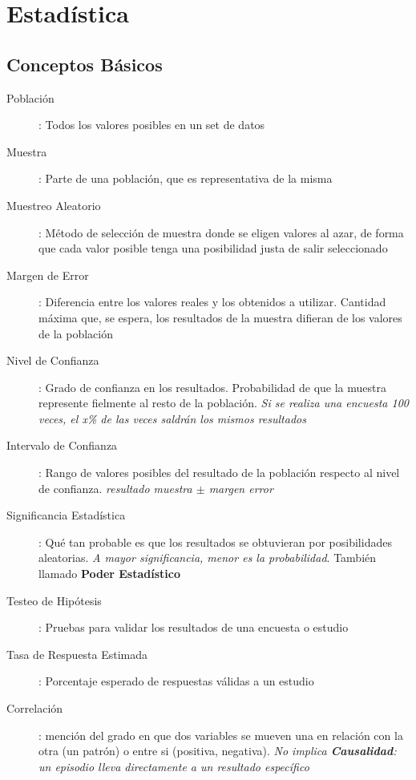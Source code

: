 
\section{Estadística}
\subsection{Conceptos Básicos}
\begin{description}
    \item [Población]{: Todos los valores posibles en un set de datos}
    \item [Muestra]{: Parte de una población, que es representativa de la misma}
    \item [Muestreo Aleatorio]{: Método de selección de muestra donde se eligen valores al azar, de forma que cada valor posible tenga una posibilidad justa de salir seleccionado}
    \item [Margen de Error]{: Diferencia entre los valores reales y los obtenidos a utilizar. Cantidad máxima que, se espera, los resultados de la muestra difieran de los valores de la población}
    \item [Nivel de Confianza]{: Grado de confianza en los resultados. Probabilidad de que la muestra represente fielmente al resto de la población. \textit{Si se realiza una encuesta 100 veces, el x\% de las veces saldrán los mismos resultados}}
    \item [Intervalo de Confianza]{: Rango de valores posibles del resultado de la población respecto al nivel de confianza. \textit{resultado muestra ${\pm}$ margen error}}
    \item [Significancia Estadística]{: Qué tan probable es que los resultados se obtuvieran por posibilidades aleatorias. \textit{A mayor significancia, menor es la probabilidad}. También llamado \textbf{Poder Estadístico}} 
    \item [Testeo de Hipótesis]{: Pruebas para validar los resultados de una encuesta o estudio}
    \item [Tasa de Respuesta Estimada]{: Porcentaje esperado de respuestas válidas a un estudio}
    \item [Correlación]{: mención del grado en que dos variables se mueven una en relación con la otra (un patrón) o entre si (positiva, negativa). \textit{No implica \textbf{Causalidad}: un episodio lleva directamente a un resultado específico}}
\end{description}

